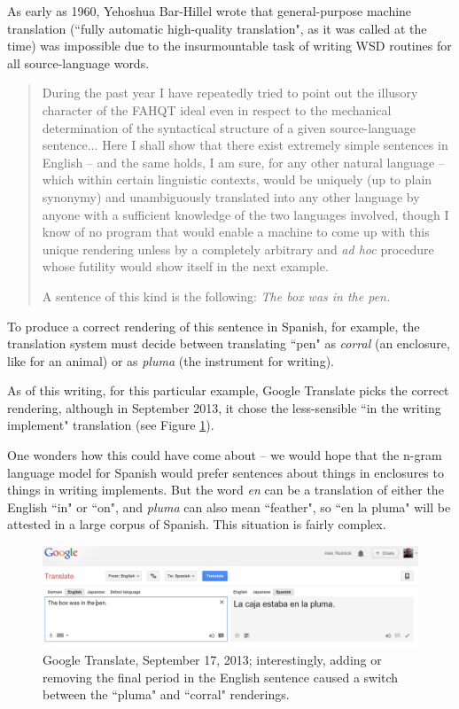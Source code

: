 As early as 1960, Yehoshua Bar-Hillel wrote that general-purpose machine
translation (``fully automatic high-quality  translation", as it was  called at
the  time) was impossible due to the insurmountable task of writing WSD
routines for all source-language words. \cite{barhillel1960}

\begin{quote}
During the past year I have repeatedly tried to point out the illusory
character of the FAHQT ideal even in respect to the mechanical determination of
the syntactical structure of a given source-language sentence... Here I shall
show that there exist extremely simple sentences in English -- and the same
holds, I am sure, for any other natural language -- which within certain
linguistic contexts, would be uniquely (up to plain synonymy) and unambiguously
translated into any other language by anyone with a sufficient knowledge of the
two languages involved, though I know of no program that would enable a machine
to come up with this unique rendering unless by a completely arbitrary and
\emph{ad hoc} procedure whose futility would show itself in the next example.

A sentence of this kind is the following: \emph{The box was in the pen.}
\end{quote}

To produce a correct rendering of this sentence in Spanish, for example, the
translation system must decide between translating ``pen" as \emph{corral} (an
enclosure, like for an animal) or as \emph{pluma} (the instrument for writing).

As of this writing, for this particular example, Google Translate picks the
correct rendering, although in September 2013, it chose the less-sensible 
``in the writing implement" translation (see Figure
\ref{fig:box-in-pen}).

One wonders how this could have come about -- we would hope that the n-gram
language model for Spanish would prefer sentences about things in enclosures to
things in writing implements.
But the word \emph{en} can be a translation of either the English ``in" or
``on", and \emph{pluma} can also mean ``feather", so ``en la pluma" will be
attested in a  large corpus of Spanish.
This situation is fairly complex.

\begin{figure}
  \includegraphics[width=12cm]{box-in-pen.png}
  \caption{Google Translate, September 17, 2013; interestingly, adding or
  removing the final period in the English sentence caused a switch between the
  ``pluma" and ``corral" renderings.}
  \label{fig:box-in-pen}
\end{figure}


